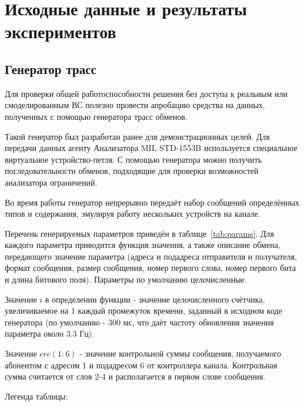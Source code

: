 \section{Исходные данные и результаты экспериментов}
\label{sec:test_listings}

\subsection{Генератор трасс}
\label{subsec:generator}

Для проверки общей работоспособности решения без доступа к реальным 
или смоделированным ВС полезно провести апробацию средства на данных, 
полученных с помощью генератора трасс обменов.

Такой генератор был разработан ранее для демонстрационных целей. Для 
передачи данных агенту Анализатора MIL STD-1553B используется специальное 
виртуальное 
устройство-петля. С помощью генератора можно получить последовательности 
обменов, подходящие для проверки возможностей анализатора ограничений.

Во время работы генератор непрерывно передаёт набор сообщений определённых 
типов и содержания, эмулируя работу нескольких устройств на канале.

Перечень генерируемых параметров приведён в таблице~\ref{tab:params}. Для 
каждого параметра приводится функция значения, а также описание 
обмена, передающего значение параметра (адреса и подадреса отправителя и 
получателя, формат сообщения, размер сообщения, номер первого слова, номер 
первого бита и длина битового поля). Параметры по умолчанию целочисленные.

Значение $i$ в определении функции - значение целочисленного счётчика, 
увеличиваемое на 1 каждый промежуток времени, заданный в исходном коде 
генератора (по умолчанию - 300 мс, что даёт частоту обновления значения 
параметра около 3.3 Гц).

Значение $crc(1:6)$ - значение контрольной суммы сообщения, получаемого 
абонентом с адресом 1 и подадресом 6 от контроллера канала. Контрольная сумма 
считается от слов 2-4 и располагается в первом слове сообщения.

Легенда таблицы:

